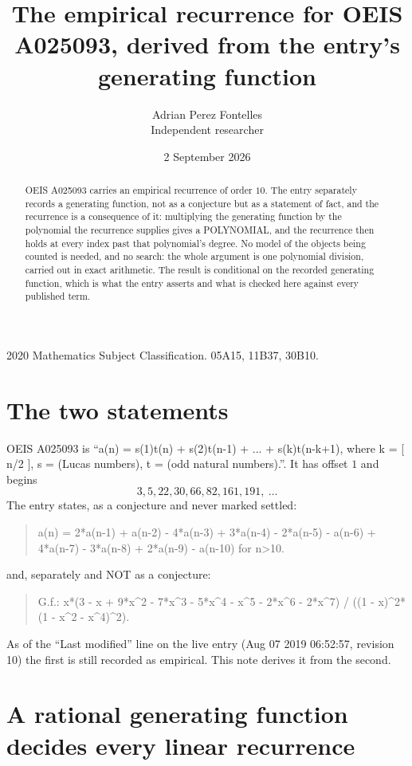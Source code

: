 \documentclass[11pt,a4paper]{article}
\title{The empirical recurrence for OEIS A025093, derived from the entry's generating function}
\author{Adrian Perez Fontelles\\ \small Independent researcher}
\date{2 September 2026}
\theoremstyle{plain}
\theoremstyle{definition}
\begin{document}
\maketitle

\begin{abstract}
OEIS A025093 carries an empirical recurrence of order $10$. The entry separately records a
generating function, not as a conjecture but as a statement of fact, and the recurrence is a
consequence of it: multiplying the generating function by the polynomial the recurrence
supplies gives a POLYNOMIAL, and the recurrence then holds at every index past that
polynomial's degree. No model of the objects being counted is needed, and no search: the
whole argument is one polynomial division, carried out in exact arithmetic. The result is
conditional on the recorded generating function, which is what the entry asserts and what is
checked here against every published term.
\end{abstract}

\noindent\small 2020 Mathematics Subject Classification. 05A15, 11B37, 30B10.\normalsize

\section{The two statements}

OEIS A025093 is ``a(n) = s(1)t(n) + s(2)t(n-1) + ... + s(k)t(n-k+1), where k = [ n/2 ], s = (Lucas numbers), t = (odd natural numbers).''. It has offset $1$ and begins
\[
3, 5, 22, 30, 66, 82, 161, 191,\ \dots
\]
The entry states, as a conjecture and never marked settled:
\begin{quote}
a(n) = 2*a(n-1) + a(n-2) - 4*a(n-3) + 3*a(n-4) - 2*a(n-5) - a(n-6) + 4*a(n-7) - 3*a(n-8) + 2*a(n-9) - a(n-10) for n>10.
\end{quote}
and, separately and NOT as a conjecture:
\begin{quote}
G.f.: x*(3 - x + 9*x\^{}2 - 7*x\^{}3 - 5*x\^{}4 - x\^{}5 - 2*x\^{}6 - 2*x\^{}7) / ((1 - x)\^{}2*(1 - x\^{}2 - x\^{}4)\^{}2).
\end{quote}
As of the ``Last modified'' line on the live entry (Aug 07 2019 06:52:57, revision 10) the first is still
recorded as empirical. This note derives it from the second.

\section{A rational generating function decides every linear recurrence}
\end{document}
